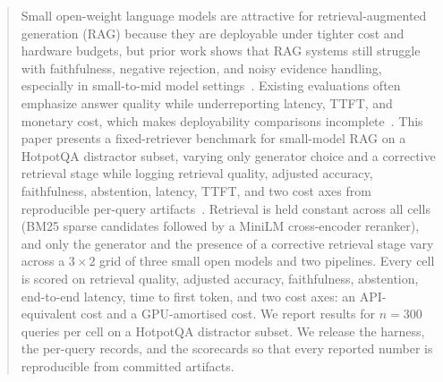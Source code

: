 
\begin{abstract}
Small open-weight language models are attractive for retrieval-augmented
generation (RAG) because they are deployable under tighter cost and
hardware budgets, but prior work shows that RAG systems still struggle
with faithfulness, negative rejection, and noisy evidence handling,
especially in small-to-mid model settings~\cite{mala2026faithfulness,chen2023rgb,zeng2025rare}.
Existing evaluations often emphasize answer quality while underreporting
latency, TTFT, and monetary cost, which makes deployability comparisons
incomplete~\cite{wu2024survey,brown2025systematic}. This paper presents
a fixed-retriever benchmark for small-model RAG on a HotpotQA distractor
subset, varying only generator choice and a corrective retrieval stage
while logging retrieval quality, adjusted accuracy, faithfulness,
abstention, latency, TTFT, and two cost axes from reproducible
per-query artifacts~\cite{mala2026faithfulness,es2023ragas,saadfalcon2023ares,elkiran2026empirical}.
Retrieval is held constant across all cells (BM25 sparse candidates
followed by a MiniLM cross-encoder reranker), and only the generator and
the presence of a corrective retrieval stage vary across a $3 \times 2$
grid of three small open models and two pipelines. Every cell is scored
on retrieval quality, adjusted accuracy, faithfulness, abstention,
end-to-end latency, time to first token, and two cost axes: an
API-equivalent cost and a GPU-amortised cost. We report results for
$n=300$ queries per cell on a HotpotQA distractor subset.
We release the harness, the per-query records, and the scorecards so that
every reported number is reproducible from committed artifacts.

\end{abstract}
